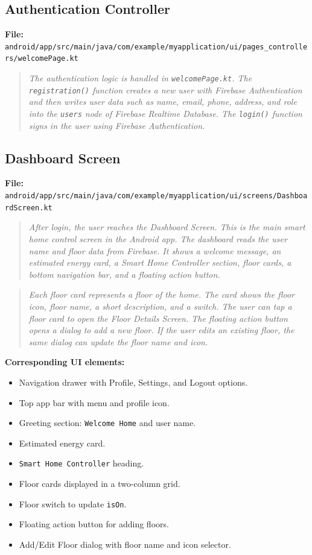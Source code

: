 \documentclass[11pt,a4paper]{article}
\begin{document}
\subsection{Authentication Controller}
\textbf{File:} \texttt{android/app/src/main/java/com/example/myapplication/ui/pages\_controllers/welcomePage.kt}

\begin{quote}
\textit{The authentication logic is handled in \texttt{welcomePage.kt}. The \texttt{registration()} function creates a new user with Firebase Authentication and then writes user data such as name, email, phone, address, and role into the \texttt{users} node of Firebase Realtime Database. The \texttt{login()} function signs in the user using Firebase Authentication.}
\end{quote}

\subsection{Dashboard Screen}
\textbf{File:} \texttt{android/app/src/main/java/com/example/myapplication/ui/screens/DashboardScreen.kt}

\begin{quote}
\textit{After login, the user reaches the Dashboard Screen. This is the main smart home control screen in the Android app. The dashboard reads the user name and floor data from Firebase. It shows a welcome message, an estimated energy card, a Smart Home Controller section, floor cards, a bottom navigation bar, and a floating action button.}
\end{quote}

\begin{quote}
\textit{Each floor card represents a floor of the home. The card shows the floor icon, floor name, a short description, and a switch. The user can tap a floor card to open the Floor Details Screen. The floating action button opens a dialog to add a new floor. If the user edits an existing floor, the same dialog can update the floor name and icon.}
\end{quote}

\textbf{Corresponding UI elements:}
\begin{itemize}
    \item Navigation drawer with Profile, Settings, and Logout options.
    \item Top app bar with menu and profile icon.
    \item Greeting section: \texttt{Welcome Home} and user name.
    \item Estimated energy card.
    \item \texttt{Smart Home Controller} heading.
    \item Floor cards displayed in a two-column grid.
    \item Floor switch to update \texttt{isOn}.
    \item Floating action button for adding floors.
    \item Add/Edit Floor dialog with floor name and icon selector.
\end{itemize}
\end{document}
